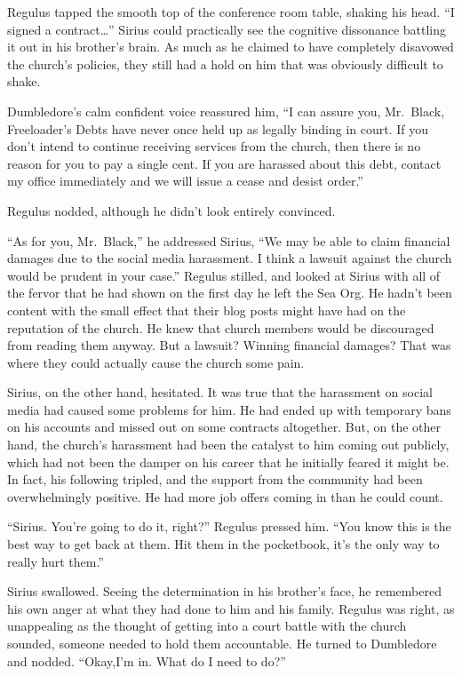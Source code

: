 \documentclass[12pt,twoside,openright]{memoir}
\begin{document}
Regulus tapped the smooth top of the conference room table, shaking his head. ``I signed a contract…'' Sirius could practically see the cognitive dissonance battling it out in his brother's brain. As much as he claimed to have completely disavowed the church's policies, they still had a hold on him that was obviously difficult to shake. 

Dumbledore's calm confident voice reassured him, ``I can assure you, Mr.\ Black, Freeloader's Debts have never once held up as legally binding in court. If you don't intend to continue receiving services from the church, then there is no reason for you to pay a single cent. If you are harassed about this debt, contact my office immediately and we will issue a cease and desist order.''

Regulus nodded, although he didn't look entirely convinced.

``As for you, Mr.\ Black,'' he addressed Sirius, ``We may be able to claim financial damages due to the social media harassment. I think a lawsuit against the church would be prudent in your case.'' Regulus stilled, and looked at Sirius with all of the fervor that he had shown on the first day he left the Sea Org. He hadn't been content with the small effect that their blog posts might have had on the reputation of the church. He knew that church members would be discouraged from reading them anyway. But a lawsuit? Winning financial damages? That was where they could actually cause the church some pain. 

Sirius, on the other hand, hesitated. It was true that the harassment on social media had caused some problems for him. He had ended up with temporary bans on his accounts and missed out on some contracts altogether. But, on the other hand, the church's harassment had been the catalyst to him coming out publicly, which had not been the damper on his career that he initially feared it might be. In fact, his following tripled, and the support from the community had been overwhelmingly positive. He had more job offers coming in than he could count. 

``Sirius. You're going to do it, right?'' Regulus pressed him. ``You know this is the best way to get back at them. Hit them in the pocketbook, it's the only way to really hurt them.'' 

Sirius swallowed. Seeing the determination in his brother's face, he remembered his own anger at what they had done to him and his family. Regulus was right, as unappealing as the thought of getting into a court battle with the church sounded, someone needed to hold them accountable. He turned to Dumbledore and nodded. ``Okay,I'm in. What do I need to do?''
\end{document}

